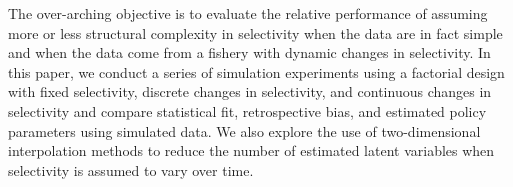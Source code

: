 The over-arching objective is to evaluate the relative performance of assuming more or less structural complexity in selectivity when the data are in fact simple and when the data come from a fishery with dynamic changes in selectivity.  In this paper, we conduct a series of simulation experiments using a factorial design with fixed selectivity, discrete changes in selectivity, and continuous changes in selectivity and compare statistical fit, retrospective bias, and estimated policy parameters using simulated data. We also explore the use of two-dimensional interpolation methods to reduce the number of estimated latent variables when selectivity is assumed to vary over time.



